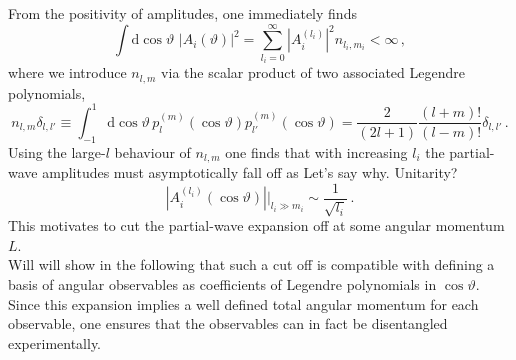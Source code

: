 \documentclass[aps,prd,reprint,nofootinbib,preprintnumbers]{revtex4}
\newcommand{\rmdx}[1]{\mbox{d} #1 \,} %
\renewcommand{\theta}{\vartheta}
\newcommand{\fred}[1]{{\color{brown!85!black}#1}}
\begin{document}
From the positivity of amplitudes, one immediately finds
\begin{equation}
    \int \rmdx{\cos\theta}  \, |A_i(\theta)|^2 = \sum_{l_i = 0}^\infty |A_i^{(l_i)}|^2 n_{l_i, m_i} < \infty\,,
\end{equation}
where we introduce $n_{l,m}$ via the scalar product of two associated Legendre polynomials,
\begin{equation}
    \label{eq:legendre-scalar-product}
    n_{l, m} \delta_{l, l'} \equiv \int_{-1}^1 \rmdx{\cos\theta} p_{l}^{(m)}(\cos\theta) p_{l'}^{(m)} (\cos\theta)  = \frac{2}{(2 l + 1)} \frac{(l + m)!}{(l - m)!} \delta_{l, l'}\,.
\end{equation}
Using the large-$l$ behaviour of $n_{l,m}$ one finds that with increasing $l_i$ the partial-wave amplitudes must asymptotically fall off as \fred{Let's say why. Unitarity?}
\begin{equation}
    |A_i^{(l_i)}(\cos\theta)| \Big|_{l_i \gg m_i} \sim \frac{1}{\sqrt{l_i}}\,.
\end{equation}
This motivates to cut the partial-wave expansion off at some angular momentum $L$.\\

Will will show in the following that such a cut off
is compatible with defining a basis of angular observables as coefficients of Legendre polynomials in $\cos\theta$. Since this expansion implies
a well defined total angular momentum for each observable, one ensures that the observables can in fact be disentangled experimentally.\\
\end{document}
